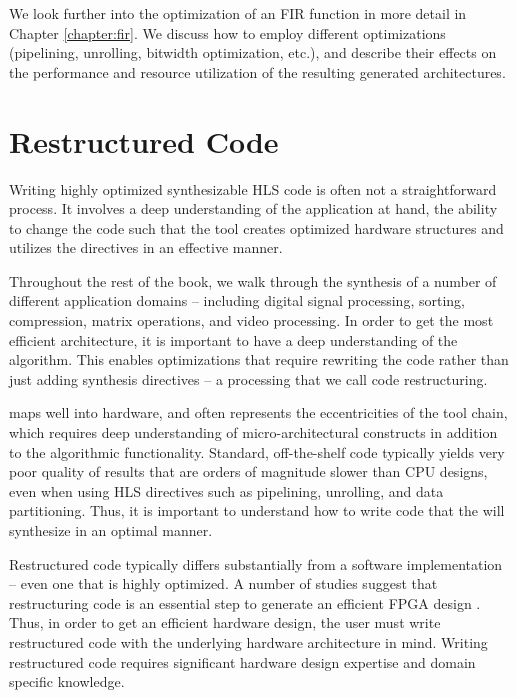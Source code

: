 We look further into the optimization of an FIR function in more detail in Chapter \ref{chapter:fir}. We discuss how to employ different optimizations (pipelining, unrolling, bitwidth optimization, etc.), and describe their effects on the performance and resource utilization of the resulting generated architectures.

\section{Restructured Code}

Writing highly optimized synthesizable HLS code is often not a straightforward process. It involves a deep understanding of the application at hand, the ability to change the code such that the \VHLS tool creates optimized hardware structures and utilizes the directives in an effective manner. 

Throughout the rest of the book, we walk through the synthesis of a number of different application domains -- including digital signal processing, sorting, compression, matrix operations, and video processing. In order to get the most efficient architecture, it is important to have a deep understanding of the algorithm. This enables optimizations that require rewriting the code rather than just adding synthesis directives -- a processing that we call code restructuring. 


 maps well into hardware, and often represents the eccentricities of the tool chain, which requires deep understanding of micro-architectural constructs in addition to the algorithmic functionality. Standard, off-the-shelf code typically yields very poor quality of results that are orders of magnitude slower than CPU designs, even when using HLS directives such as pipelining, unrolling, and data partitioning. Thus, it is important to understand how to write code that the \VHLS will synthesize in an optimal manner.

Restructured code typically differs substantially from a software implementation -- even one that is highly optimized. A number of studies suggest that restructuring code is an essential step to generate an efficient FPGA
design \cite{mataidesigning, matai2energy, cong2011high, chen2012fpga, lee250high}. Thus, in order to get an efficient hardware design, the user must write restructured code with the underlying
hardware architecture in mind. Writing restructured code requires significant
hardware design expertise and domain specific knowledge. 

